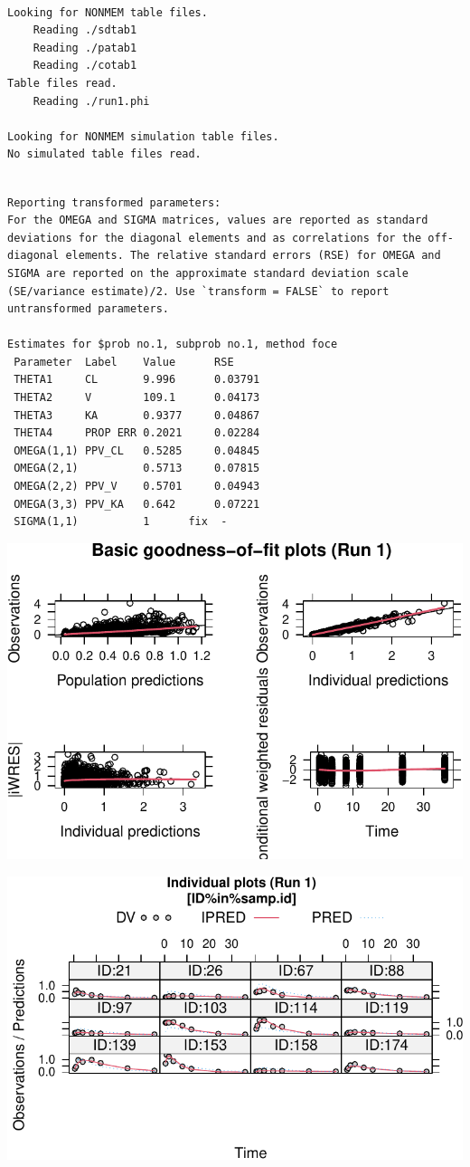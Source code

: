 \documentclass[
  letterpaper,
  toc=chapterentrywithdots,
  11pt,
  headings=small]{scrreprt}
\begin{document}
\begin{verbatim}

Looking for NONMEM table files.
    Reading ./sdtab1 
    Reading ./patab1 
    Reading ./cotab1 
Table files read.
    Reading ./run1.phi 

Looking for NONMEM simulation table files.
No simulated table files read.
\end{verbatim}

\begin{verbatim}

Reporting transformed parameters:
For the OMEGA and SIGMA matrices, values are reported as standard deviations for the diagonal elements and as correlations for the off-diagonal elements. The relative standard errors (RSE) for OMEGA and SIGMA are reported on the approximate standard deviation scale (SE/variance estimate)/2. Use `transform = FALSE` to report untransformed parameters.

Estimates for $prob no.1, subprob no.1, method foce
 Parameter  Label    Value      RSE
 THETA1     CL       9.996      0.03791
 THETA2     V        109.1      0.04173
 THETA3     KA       0.9377     0.04867
 THETA4     PROP ERR 0.2021     0.02284
 OMEGA(1,1) PPV_CL   0.5285     0.04845
 OMEGA(2,1)          0.5713     0.07815
 OMEGA(2,2) PPV_V    0.5701     0.04943
 OMEGA(3,3) PPV_KA   0.642      0.07221
 SIGMA(1,1)          1      fix  - 
\end{verbatim}

\includegraphics{sec/results_files/figure-pdf/unnamed-chunk-2-1.pdf}

\includegraphics{sec/results_files/figure-pdf/unnamed-chunk-2-2.pdf}
\end{document}
